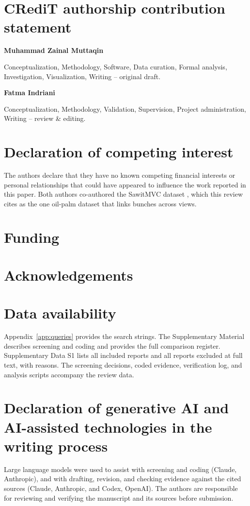 \section*{CRediT authorship contribution statement}
\textbf{Muhammad Zainal Muttaqin}\par
Conceptualization, Methodology, Software, Data curation, Formal analysis, Investigation, Visualization, Writing -- original draft.

\textbf{Fatma Indriani}\par
Conceptualization, Methodology, Validation, Supervision, Project administration, Writing -- review \& editing.

\section*{Declaration of competing interest}
The authors declare that they have no known competing financial interests or personal relationships that could have appeared to influence the work reported in this paper. Both authors co-authored the SawitMVC dataset \citep{indriani2026sawitmvc}, which this review cites as the one oil-palm dataset that links bunches across views.

\section*{Funding}

\section*{Acknowledgements}

\section*{Data availability}
Appendix~\ref{app:queries} provides the search strings. The Supplementary Material describes screening and coding and provides the full comparison register. Supplementary Data S1 lists all included reports and all reports excluded at full text, with reasons. The screening decisions, coded evidence, verification log, and analysis scripts accompany the review data. 

\section*{Declaration of generative AI and AI-assisted technologies in the writing process}
Large language models were used to assist with screening and coding (Claude, Anthropic), and with drafting, revision, and checking evidence against the cited sources (Claude, Anthropic, and Codex, OpenAI). The authors are responsible for reviewing and verifying the manuscript and its sources before submission.
